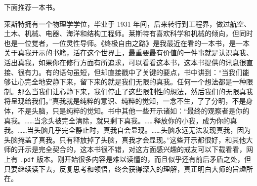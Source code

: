 下面推荐一本书。

\begin{book}
    莱斯特拥有一个物理学学位，毕业于 1931 年间，后来转行到工程界，做过航空、土木、机械、电器、海洋和结构工程师。莱斯特有喜欢科学和机械的倾向，但同时也是一位觉者，一位灵性导师。《终极自由之路》是我最近在看的一本书，是一本关于真我开示的书籍，活在这个世界上，最重要最有价值的一件事就是认识真我、活出真我，如果你在修行方面有所追求，可以看看这本书，这本书提供的讯息很直接、很有力。有的语句虽短，但却直接戳中了关键的要点，书中讲到：“当我们能够让心完全地安静下来，留下来的就是我们无限的真我。任何一个想法都是一种限制。那么当我们让心静下来，我们停止了这些限制性的想法，然后我们的无限真我将呈现给我们。”真我就是纯粹的意识、纯粹的觉知，一念不生，了了分明，不是身体，不是头脑，只是纯粹的觉知。书中其他一些开示诸如：“最终的观察者是你的真我。……当念头被完全清除，就只剩下真我。……释放你的小我，成为你的真我。……当头脑几乎完全静止时，真我自会显现。……头脑永远无法发现真我，因为头脑掩盖了真我。只有释放掉了头脑，真我才会显现。”这些开示都很好，和其他大师的开示是完全契合的，这本书很不错，对这方面感兴趣的戒友可以下载看看，网上有 \texttt{.pdf} 版本。刚开始很多内容是难以读懂的，而且似乎还有前后矛盾之处，但只要继续读下去，反复思考和领悟，终会获得深入的理解，真正明白大师的旨趣所在。
\end{book}
